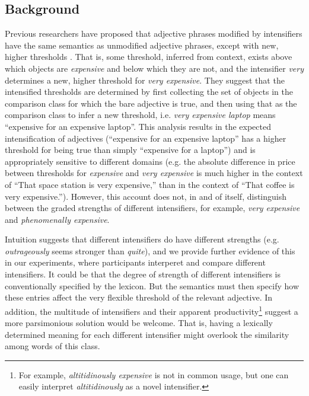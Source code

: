 \documentclass[10pt,letterpaper]{article}
\newcommand{\w}[1]{\emph{#1}}
\begin{document}
\subsection{Background}

Previous researchers have proposed that adjective phrases modified by intensifiers have the same semantics as unmodified adjective phrases, except with new, higher thresholds \cite{kennedyMcnally, klein, wheeler}. That is, some threshold, inferred from context, exists above which objects are \w{expensive} and below which they are not, and the intensifier \w{very} determines a new, higher threshold for \w{very expensive}.
They suggest that the intensified thresholds are determined by first collecting the set of objects in the comparison class for which the bare adjective is true, and then using that as the comparison class to infer a new threshold, i.e. \w{very expensive laptop} means ``expensive for an expensive laptop''. This analysis results in the expected intensification of adjectives (``expensive for an expensive laptop'' has a higher threshold for being true than simply ``expensive for a laptop'') and is appropriately sensitive to different domains (e.g. the absolute difference in price between thresholds for \w{expensive} and \w{very expensive} is much higher in the context of ``That space station is very expensive,'' than in the context of ``That coffee is very expensive.'').
However, this account does not, in and of itself, distinguish between the graded strengths of different intensifiers, for example, \w{very expensive} and \w{phenomenally expensive}.

Intuition suggests that different intensifiers do have different strengths (e.g. \w{outrageously} seems stronger than \w{quite}), and we provide further evidence of this in our experiments, where participants interperet and compare different intensifiers.
It could be that the degree of strength of different intensifiers is conventionally specified by the lexicon. But the semantics must then specify how these entries affect the very flexible threshold of the relevant adjective.
In addition, the multitude of intensifiers \cite{bolinger} and their apparent productivity\footnote{For example, \w{altitidinously expensive} is not in common usage, but one can easily interpret \w{altitidinously} as a novel intensifier.} suggest a more parsimonious solution would be welcome. 
That is, having a lexically determined meaning for each different intensifier might overlook the similarity among words of this class.
\end{document}

